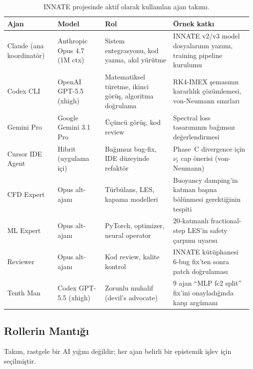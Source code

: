 \begin{table}[H]
\centering
\footnotesize
\begin{tabular}{p{2.6cm} p{2.6cm} p{3.4cm} p{4.4cm}}
\toprule
\textbf{Ajan} & \textbf{Model} & \textbf{Rol} & \textbf{Örnek katkı} \\
\midrule
Claude (ana koordinatör) &
Anthropic Opus 4.7 (1M ctx) &
Sistem entegrasyonu, kod yazma, akıl yürütme &
INNATE v2/v3 model dosyalarının yazımı, training pipeline kurulumu \\
\addlinespace
Codex CLI &
OpenAI GPT-5.5 (xhigh) &
Matematiksel türetme, ikinci görüş, algoritma doğrulama &
RK4-IMEX şemasının kararlılık çözümlemesi, von-Neumann sınırları \\
\addlinespace
Gemini Pro &
Google Gemini 3.1 Pro &
Üçüncü görüş, kod review &
Spectral loss tasarımının bağımsız değerlendirmesi \\
\addlinespace
Cursor IDE Agent &
Hibrit (uygulama içi) &
Bağımsız bug-fix, IDE düzeyinde refaktör &
Phase~C divergence için $\nu_t$ cap önerisi (von-Neumann) \\
\addlinespace
CFD Expert &
Opus alt-ajanı &
Türbülans, LES, kapama modelleri &
Buoyancy damping'in katman başına bölünmesi gerektiğinin tespiti \\
\addlinespace
ML Expert &
Opus alt-ajanı &
PyTorch, optimizer, neural operator &
20-katmanlı fractional-step LES'in safety çarpımı uyarısı \\
\addlinespace
Reviewer &
Opus alt-ajanı &
Kod review, kalite kontrol &
INNATE kütüphanesi 6-bug fix'ten sonra patch doğrulaması \\
\addlinespace
Tenth Man &
Codex GPT-5.5 (xhigh) &
Zorunlu muhalif (devil's advocate) &
9 ajan ``MLP fc2 split'' fix'ini onayladığında karşı argümanı \\
\bottomrule
\end{tabular}
\caption{INNATE projesinde aktif olarak kullanılan ajan takımı.}
\label{tab:ma_ajanlar}
\end{table}

\subsection{Rollerin Mantığı}

Takım, rastgele bir AI yığını değildir; her ajan belirli bir epistemik
işlev için seçilmiştir.

